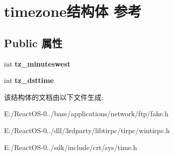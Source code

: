 \hypertarget{structtimezone}{}\section{timezone结构体 参考}
\label{structtimezone}
\subsection*{Public 属性}
\begin{DoxyCompactItemize}
\item 
\mbox{\label{structtimezone_a3042f7eff6e1b980728def76b1fa0eb7}} 
int {\bfseries tz\+\_\+minuteswest}
\item 
\mbox{\label{structtimezone_a85259977aeb63b17e6ce94f19afdfd99}} 
int {\bfseries tz\+\_\+dsttime}
\end{DoxyCompactItemize}


该结构体的文档由以下文件生成\+:\begin{DoxyCompactItemize}
\item 
E\+:/\+React\+O\+S-\/0../base/applications/network/ftp/fake.\+h\item 
E\+:/\+React\+O\+S-\/0../dll/3rdparty/libtirpc/tirpc/wintirpc.\+h\item 
E\+:/\+React\+O\+S-\/0../sdk/include/crt/sys/time.\+h\end{DoxyCompactItemize}
